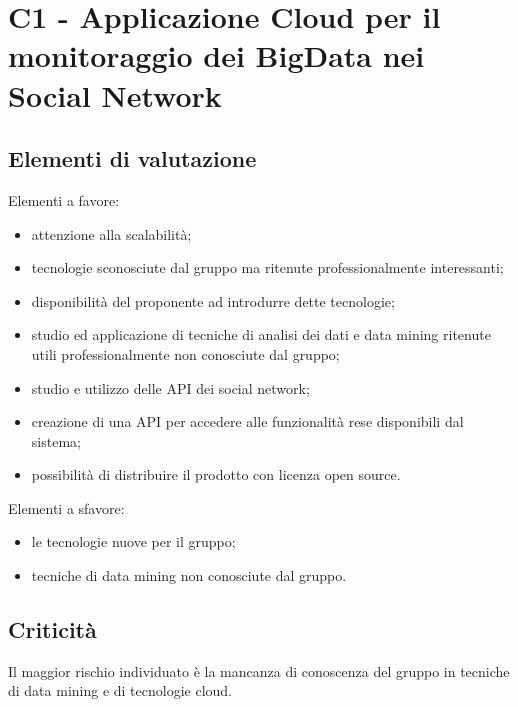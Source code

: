 \section{C1 - Applicazione Cloud per il monitoraggio dei BigData nei Social Network}{
	\subsection{Elementi di valutazione}{
		Elementi a favore:
		\begin{itemize}
			\item attenzione alla scalabilità;
			\item tecnologie sconosciute dal gruppo ma ritenute professionalmente interessanti;
			\item disponibilità del proponente ad introdurre dette tecnologie;
			\item studio ed applicazione di tecniche di analisi dei dati e data mining ritenute utili professionalmente non conosciute dal gruppo;
			\item studio e utilizzo delle API dei social network;
			\item creazione di una API per accedere alle funzionalità rese disponibili dal sistema;
			\item possibilità di distribuire il prodotto con licenza open source.
		\end{itemize}
		
		Elementi a sfavore:
		\begin{itemize}
			\item le tecnologie nuove per il gruppo;
			\item tecniche di data mining non conosciute dal gruppo.
		\end{itemize}
	}
	\subsection{Criticità}{
		Il maggior rischio individuato è la mancanza di conoscenza del gruppo in tecniche di data mining e di tecnologie cloud.
	}
}
